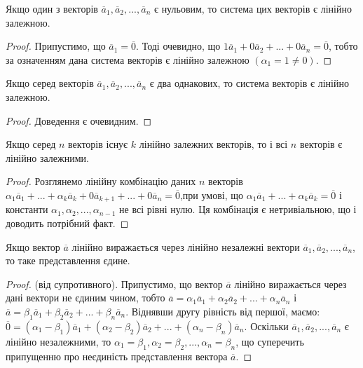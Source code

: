 \begin{claim}
	Якщо один з векторів $\overline{a}_1, \overline{a}_2, ..., \overline{a}_n$ є нульовим, то система цих векторів
	є лінійно залежною. 
\end{claim}
\begin{proof}
	Припустимо, що $\overline{a}_1 = \overline{0}$. Тоді очевидно, що
	$1\overline{a}_1 + 0 \overline{a}_2 + ... + 0 \overline{a}_n = \overline{0}$, тобто за означенням дана система векторів є лінійно
	залежною $(\alpha_1 = 1 \neq 0)$. 
\end{proof}

\begin{claim}
	Якщо серед векторів $\overline{a}_1, \overline{a}_2, ..., \overline{a}_n$ є два однакових, то система векторів є
	лінійно залежною.
\end{claim}
\begin{proof}
	Доведення є очевидним.
\end{proof}

\begin{claim}
	Якщо серед $n$ векторів існує $k$ лінійно залежних векторів, то і всі $n$
	векторів є лінійно залежними.
\end{claim}
\begin{proof}
	Розглянемо лінійну комбінацію даних $n$ векторів
	$\alpha_1\overline{a}_1 + ... + \alpha_{k}\overline{a}_{k} + 0\overline{a}_{k+1} + ... + 0\overline{a}_{n} = \overline{0}$,при умові, що
	$\alpha_1\overline{a}_1 + ... + \alpha_{k}\overline{a}_{k} = \overline{0}$ і константи $\alpha_1, \alpha_2, ..., \alpha_{n-1}$ не всі рівні нулю. Ця
	комбінація є нетривіальною, що і доводить потрібний факт.
\end{proof}

\begin{claim}
	Якщо вектор $\overline{a}$ лінійно виражається через лінійно незалежні вектори
	$\overline{a}_1, \overline{a}_2, ..., \overline{a}_n$, то таке представлення єдине. 
\end{claim}
\begin{proof}
	(від супротивного). Припустимо, що вектор $\overline{a}$ лінійно виражається
	через дані вектори не єдиним чином, тобто
	$\overline{a} = \alpha_{1}\overline{a}_{1} + \alpha_{2}\overline{a}_{2} + ... + \alpha_{n}\overline{a}_{n}$ і $\overline{a} = \beta_{1}\overline{a}_{1} + \beta_{2}\overline{a}_{2} + ... + \beta_{n}\overline{a}_{n}$.
	Віднявши другу рівність від першої, маємо:
	$\overline{0} = (\alpha_1 - \beta_1)\overline{a}_1 + (\alpha_2 - \beta_2)\overline{a}_2 + ... + (\alpha_n - \beta_n)\overline{a}_n$.
	Оскільки $\overline{a}_1, \overline{a}_2, ..., \overline{a}_n$ є лінійно незалежними, то $\alpha_1 = \beta_1, \alpha_2 = \beta_2, ..., \alpha_n = \beta_n$, що
	суперечить припущенню про неєдиність представлення вектора $\overline{a}$.
\end{proof}

